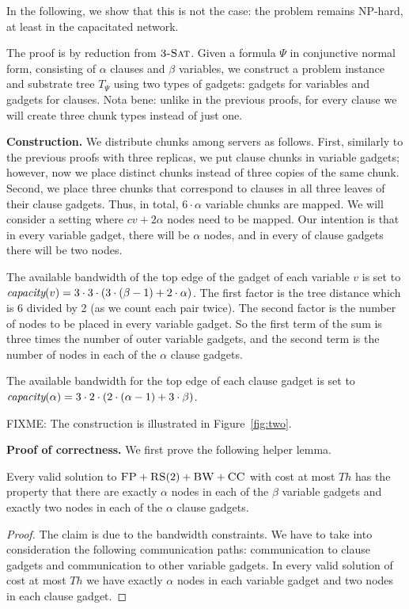 \documentclass[9pt,twocolumn]{scrartcl}
\newcommand{\clauses}{\alpha}
\newcommand{\vars}{\beta}
\newcommand{\capa}{\emph{capacity}}
\newcommand{\CC}{\textsc{CC}}
\newcommand{\FP}{\textsc{FP}}
\newcommand{\RS}{\textsc{RS}}
\newcommand{\BW}{\textsc{BW}}
\newcommand{\TSAT}{\textsc{3-Sat}}
\newcommand{\Formula}{\ensuremath{\Psi}}
\newcommand{\Thr}{\ensuremath{Th}}
\begin{document}
\begin{appendix}
In the following, we show that this is not the case: the problem remains
NP-hard, at least in the capacitated network.

The proof is by reduction from $\TSAT$. Given a formula $\Formula$ in
conjunctive normal form, consisting of $\clauses$ clauses and $\vars$ variables, we construct a problem instance and substrate tree
$T_{\Formula}$ using two types of gadgets: gadgets for variables and
gadgets for clauses. Nota bene:
unlike in the previous proofs, for every clause we will create three chunk types instead of just one.

\textbf{Construction.}
We distribute chunks among servers as follows. First,
similarly to the previous proofs with three replicas, we put clause chunks in
variable gadgets; however, now we place distinct chunks instead of
three copies of the same chunk. Second, we place three chunks that
correspond to clauses in all three leaves of their clause gadgets.
Thus, in total, $6 \cdot \clauses$ variable chunks are mapped.
We will consider a setting where $cv + 2\clauses$ nodes need to be mapped. Our intention is that in
every variable gadget, there will be $\clauses$ nodes,
 and in every of clause
gadgets there will be two nodes.

The available bandwidth of the top edge of the gadget of each variable $v$ is set to
$\capa(v) = 3  \cdot  3  \cdot  (3  \cdot  (\vars - 1) + 2  \cdot  \clauses) $.
The first factor is the tree distance which is 6 divided by 2 (as
we count each pair twice). The second factor is
the number of nodes to be placed in every variable gadget.
So the first term of the
sum is three times the number of outer variable gadgets,
and the second term is the
number of nodes in each of the $\clauses$ clause gadgets.

The available bandwidth for the top edge of each clause gadget is set to
$\capa(\clauses) = 3  \cdot  2  \cdot  (2  \cdot  (\clauses - 1) + 3  \cdot  \vars) $.

FIXME: The construction is illustrated in Figure~\ref{fig:two}.


\textbf{Proof of correctness.}
We first prove the following helper lemma.
\begin{lemma}
Every valid solution to $\FP+\RS(2)+\BW+\CC$
with cost at most $\Thr$ has the property that
there are exactly $\clauses$ nodes in each of the $\vars$ variable gadgets
and exactly two nodes in each of the $\clauses$ clause gadgets.
\end{lemma}
\begin{proof}
The claim is due to the bandwidth constraints. We have to take into
consideration the following communication paths:
communication to clause gadgets and
communication to
other variable gadgets.
In every valid solution of cost at most $\Thr$ we have exactly
$\clauses$ nodes in each variable gadget and two nodes in each clause gadget.
\end{proof}


\end{appendix}
\end{document}

